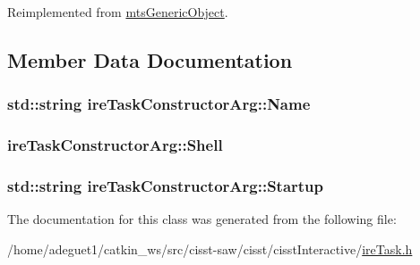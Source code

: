 Reimplemented from \hyperlink{classmts_generic_object_a4916a6c62ee5b167d7c93c88ab72523a}{mts\-Generic\-Object}.



\subsection{Member Data Documentation}
\hypertarget{classire_task_constructor_arg_acdf26b246ab025d372e37d4dd177dc22}{
\subsubsection[{Name}]{\setlength{\rightskip}{0pt plus 5cm}std\-::string ire\-Task\-Constructor\-Arg\-::\-Name}}\label{classire_task_constructor_arg_acdf26b246ab025d372e37d4dd177dc22}
\hypertarget{classire_task_constructor_arg_a5235380c8daceb769828415ebdec263e}{
\subsubsection[{Shell}]{ ire\-Task\-Constructor\-Arg\-::\-Shell}}\label{classire_task_constructor_arg_a5235380c8daceb769828415ebdec263e}
\hypertarget{classire_task_constructor_arg_ac3551e515c358cec7e4c193d120dbd3f}{
\subsubsection[{Startup}]{\setlength{\rightskip}{0pt plus 5cm}std\-::string ire\-Task\-Constructor\-Arg\-::\-Startup}}\label{classire_task_constructor_arg_ac3551e515c358cec7e4c193d120dbd3f}


The documentation for this class was generated from the following file\-:\begin{DoxyCompactItemize}
\item 
/home/adeguet1/catkin\-\_\-ws/src/cisst-\/saw/cisst/cisst\-Interactive/\hyperlink{ire_task_8h}{ire\-Task.\-h}\end{DoxyCompactItemize}
